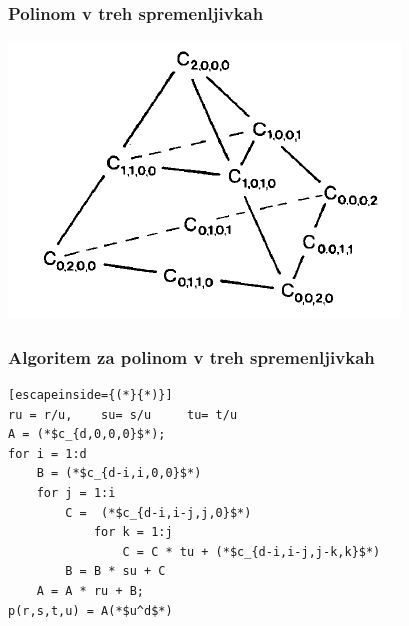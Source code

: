 \documentclass{beamer}
\begin{document}
\begin{frame}
\frametitle{Polinom v treh spremenljivkah}
\begin{center}
\includegraphics[width=0.7\linewidth]{tetraeder.PNG}
\end{center}
\end{frame}

\begin{frame}[fragile]
\frametitle{Algoritem za polinom v treh spremenljivkah}
\begin{lstlisting}[escapeinside={(*}{*)}]
ru = r/u,	 su= s/u	 tu= t/u
A = (*$c_{d,0,0,0}$*);
for i = 1:d
    B = (*$c_{d-i,i,0,0}$*)
    for j = 1:i
        C =  (*$c_{d-i,i-j,j,0}$*)
            for k = 1:j
                C = C * tu + (*$c_{d-i,i-j,j-k,k}$*)
        B = B * su + C
    A = A * ru + B;
p(r,s,t,u) = A(*$u^d$*)
\end{lstlisting}
\end{frame}
\end{document}
